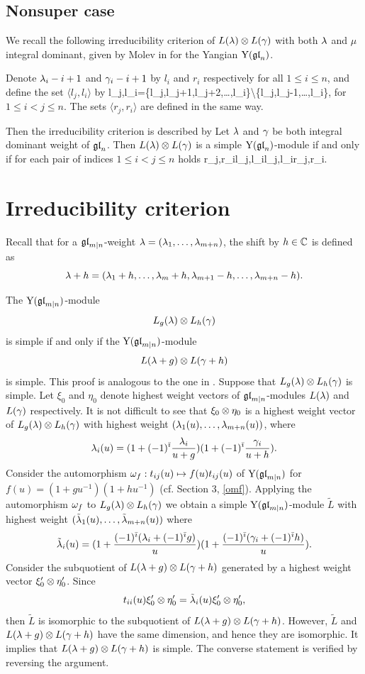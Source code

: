 \documentclass[12pt]{amsart}
\begin{document}
\subsection{Nonsuper case}
We recall the following irreducibility criterion of $L(\lambda)\otimes L(\gamma)$ with both $\lambda$ and $\mu$  integral dominant, given by Molev in \cite{Mol 2002} for the Yangian ${\rm Y}(\mathfrak{gl}_n)$.

Denote $\lambda_i-i+1$ and $\gamma_i-i+1$ by $l_i$ and $r_i$ respectively for all $1\leq i\leq n$, and
 define the set $\langle l_j,l_i\rangle$ by
\beq
\langle l_j,l_i\rangle=\{l_j,l_j+1,l_j+2,\ldots,l_i\}\backslash\{l_j,l_{j-1},\ldots,l_i\},
\eeq
for $1\leq i< j\leq n$. The sets $\langle r_j,r_i\rangle$ are defined in the same way.

Then the irreducibility criterion is described by
\label{thm:nonsuper}
Let $\lambda$ and $\gamma$ be both integral dominant weight of $\mathfrak{gl}_{n}$.
Then $L(\lambda)\otimes L(\gamma)$ is a simple ${\rm Y}(\mathfrak{gl}_{n})$-module if and only if for each pair of indices $1\leq i< j\leq n$ holds
r_j,r_i\notin \langle l_j,l_i\rangle\quad{}\quad l_j,l_i\notin \langle r_j,r_i\rangle.
\eeq
\eth

\section{Irreducibility criterion}\label{sec:cri}
Recall that for a $\mathfrak{gl}_{m|n}$-weight $\lambda=(\lambda_1,\ldots,\lambda_{m+n})$, the shift by $h\in \mathbb{C}$ is defined as
\[
\lambda+h=(\lambda_1+h,\ldots,\lambda_m+h,\lambda_{m+1}-h,\ldots,\lambda_{m+n}-h).
\]

\bpr\label{prop:shif}
The ${\rm Y}(\mathfrak{gl}_{m|n})$-module
\[
L_g(\lambda)\otimes L_h(\gamma)
\]
is simple if and only if the ${\rm Y}(\mathfrak{gl}_{m|n})$-module
\[
L(\lambda+g)\otimes L(\gamma+h)
\]
is simple.
\epr
\bpf
This proof is analogous to the one in \cite{Mol 2002}.
Suppose that $L_g(\lambda)\otimes L_h(\gamma)$ is simple.
Let $\xi_0$ and $\eta_0$ denote  highest weight vectors of $\mathfrak{gl}_{m|n}$-modules $L(\lambda)$ and $L(\gamma)$ respectively.
It is not difficult to see that $\xi_0\otimes\eta_0$ is a highest weight vector of $L_g(\lambda)\otimes L_h(\gamma)$ with highest weight $(\lambda_1(u),\ldots,\lambda_{m+n}(u))$, where
\[
\lambda_i(u)=(1+(-1)^{\bar{\imath}}\frac{\lambda_i}{u+g})(1+(-1)^{\bar{\imath}}\frac{\gamma_i}{u+h}).
\]
Consider the automorphism $\omega_f:t_{ij}(u)\mapsto f(u)t_{ij}(u)$ of ${\rm Y}(\mathfrak{gl}_{m|n})$ for$f(u)=(1+gu^{-1})(1+hu^{-1})$ (cf. Section 3, \eqref{omf}).
Applying the automorphism $\omega_f$ to $L_g(\lambda)\otimes L_h(\gamma)$ we obtain a simple ${\rm Y}(\mathfrak{gl}_{m|n})$-module $\tilde{L}$ with highest weight $(\tilde{\lambda}_1(u),\ldots,\tilde{\lambda}_{m+n}(u))$ where
\[
\tilde{\lambda}_i(u)=(1+\frac{(-1)^{\bar{\imath}}(\lambda_i+(-1)^{\bar{\imath}}g)}{u})(1+\frac{(-1)^{\bar{\imath}}(\gamma_i+(-1)^{\bar{\imath}}h)}{u}).
\]
Consider the subquotient of $L(\lambda+g)\otimes L(\gamma+h)$ generated by a highest weight vector $\xi_0'\otimes\eta_0'$.
Since
\[
t_{ii}(u)\xi_0'\otimes \eta_0'=\tilde{\lambda}_i(u)\xi_0'\otimes \eta_0',
\]
then $\tilde{L}$ is isomorphic to the subquotient of $L(\lambda+g)\otimes L(\gamma+h)$. However, $\tilde{L}$ and $L(\lambda+g)\otimes L(\gamma+h)$ have the same dimension, and hence they are isomorphic. It implies that $L(\lambda+g)\otimes L(\gamma+h)$ is simple. The converse statement is verified by reversing the argument.
\epf
\end{document}
